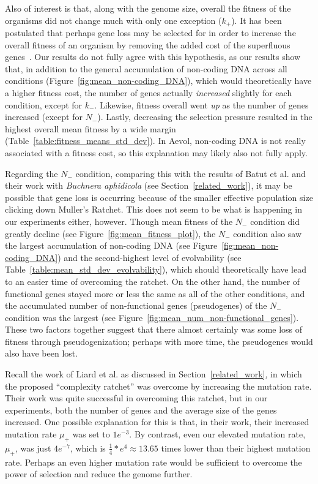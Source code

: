 Also of interest is that, along with the genome size, overall the fitness of the organisms did not change much with only one exception ($k_+$). It has been postulated that perhaps gene loss may be selected for in order to increase the overall fitness of an organism by removing the added cost of the superfluous genes~\cite{koskiniemi2012}. Our results do not fully agree with this hypothesis, as our results show that, in addition to the general accumulation of non-coding DNA across all conditions (Figure~\ref{fig:mean_non-coding_DNA}), which would theoretically have a higher fitness cost, the number of genes actually \textit{increased} slightly for each condition, except for $k_-$. Likewise, fitness overall went \textit{up} as the number of genes increased (except for $N_-$). Lastly, decreasing the selection pressure resulted in the highest overall mean fitness by a wide margin (Table~\ref{table:fitness_means_std_dev}). In Aevol, non-coding DNA is not really associated with a fitness cost, so this explanation may likely also not fully apply. 

Regarding the $N_-$ condition, comparing this with the results of Batut et al. and their work with \textit{Buchnera aphidicola} (see Section~\ref{related_work}), it may be possible that gene loss is occurring because of the smaller effective population size clicking down Muller's Ratchet. This does not seem to be what is happening in our experiments either, however. Though mean fitness of the $N_-$ condition did greatly decline (see Figure~\ref{fig:mean_fitness_plot}), the $N_-$ condition also saw the largest accumulation of non-coding DNA (see Figure~\ref{fig:mean_non-coding_DNA}) and the second-highest level of evolvability (see Table~\ref{table:mean_std_dev_evolvability}), which should theoretically have lead to an easier time of overcoming the ratchet. On the other hand, the number of functional genes stayed more or less the same as all of the other conditions, and the accumulated number of non-functional genes (pseudogenes) of the $N_-$ condition was the largest (see Figure~\ref{fig:mean_num_non-functional_genes}). These two factors together suggest that there almost certainly was some loss of fitness through pseudogenization; perhaps with more time, the pseudogenes would also have been lost.

Recall the work of Liard et al.\cite{Liard.2018} as discussed in Section~\ref{related_work}, in which the proposed ``complexity ratchet'' was overcome by increasing the mutation rate. Their work was quite successful in overcoming this ratchet, but in our experiments, both the number of genes and the average size of the genes increased. One possible explanation for this is that, in their work, their increased mutation rate $\mu_+$ was set to $1e^{-3}$.  By contrast, even our elevated mutation rate, $\mu_+$, was just $4e^{-7}$, which is $\frac{1}{4}*e^4 \approx 13.65$ times lower than their highest mutation rate. Perhaps an even higher mutation rate would be sufficient to overcome the power of selection and reduce the genome further. 

